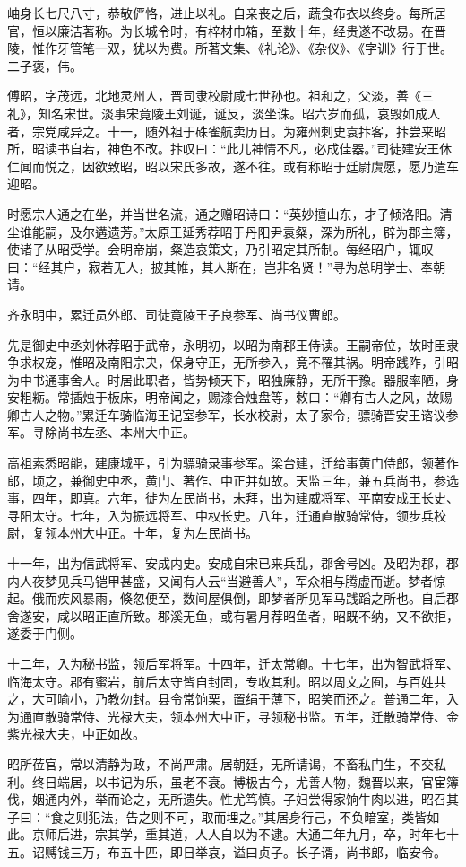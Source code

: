 \documentclass[12pt,UTF8]{ctexbook}
\begin{document}
岫身长七尺八寸，恭敬俨恪，进止以礼。自亲丧之后，蔬食布衣以终身。每所居官，恒以廉洁著称。为长城令时，有梓材巾箱，至数十年，经贵遂不改易。在晋陵，惟作牙管笔一双，犹以为费。所著文集、《礼论》、《杂仪》、《字训》行于世。二子褒，伟。

傅昭，字茂远，北地灵州人，晋司隶校尉咸七世孙也。祖和之，父淡，善《三礼》，知名宋世。淡事宋竟陵王刘诞，诞反，淡坐诛。昭六岁而孤，哀毁如成人者，宗党咸异之。十一，随外祖于硃雀航卖历日。为雍州刺史袁抃客，抃尝来昭所，昭读书自若，神色不改。抃叹曰：“此儿神情不凡，必成佳器。”司徒建安王休仁闻而悦之，因欲致昭，昭以宋氏多故，遂不往。或有称昭于廷尉虞愿，愿乃遣车迎昭。

时愿宗人通之在坐，并当世名流，通之赠昭诗曰：“英妙擅山东，才子倾洛阳。清尘谁能嗣，及尔遘遗芳。”太原王延秀荐昭于丹阳尹袁粲，深为所礼，辟为郡主簿，使诸子从昭受学。会明帝崩，粲造哀策文，乃引昭定其所制。每经昭户，辄叹曰：“经其户，寂若无人，披其帷，其人斯在，岂非名贤！”寻为总明学士、奉朝请。

齐永明中，累迁员外郎、司徒竟陵王子良参军、尚书仪曹郎。

先是御史中丞刘休荐昭于武帝，永明初，以昭为南郡王侍读。王嗣帝位，故时臣隶争求权宠，惟昭及南阳宗夬，保身守正，无所参入，竟不罹其祸。明帝践阼，引昭为中书通事舍人。时居此职者，皆势倾天下，昭独廉静，无所干豫。器服率陋，身安粗粝。常插烛于板床，明帝闻之，赐漆合烛盘等，敕曰：“卿有古人之风，故赐卿古人之物。”累迁车骑临海王记室参军，长水校尉，太子家令，骠骑晋安王谘议参军。寻除尚书左丞、本州大中正。

高祖素悉昭能，建康城平，引为骠骑录事参军。梁台建，迁给事黄门侍郎，领著作郎，顷之，兼御史中丞，黄门、著作、中正并如故。天监三年，兼五兵尚书，参选事，四年，即真。六年，徙为左民尚书，未拜，出为建威将军、平南安成王长史、寻阳太守。七年，入为振远将军、中权长史。八年，迁通直散骑常侍，领步兵校尉，复领本州大中正。十年，复为左民尚书。

十一年，出为信武将军、安成内史。安成自宋已来兵乱，郡舍号凶。及昭为郡，郡内人夜梦见兵马铠甲甚盛，又闻有人云“当避善人”，军众相与腾虚而逝。梦者惊起。俄而疾风暴雨，倏忽便至，数间屋俱倒，即梦者所见军马践蹈之所也。自后郡舍遂安，咸以昭正直所致。郡溪无鱼，或有暑月荐昭鱼者，昭既不纳，又不欲拒，遂委于门侧。

十二年，入为秘书监，领后军将军。十四年，迁太常卿。十七年，出为智武将军、临海太守。郡有蜜岩，前后太守皆自封固，专收其利。昭以周文之囿，与百姓共之，大可喻小，乃教勿封。县令常饷栗，置绢于薄下，昭笑而还之。普通二年，入为通直散骑常侍、光禄大夫，领本州大中正，寻领秘书监。五年，迁散骑常侍、金紫光禄大夫，中正如故。

昭所莅官，常以清静为政，不尚严肃。居朝廷，无所请谒，不畜私门生，不交私利。终日端居，以书记为乐，虽老不衰。博极古今，尤善人物，魏晋以来，官宦簿伐，姻通内外，举而论之，无所遗失。性尤笃慎。子妇尝得家饷牛肉以进，昭召其子曰：“食之则犯法，告之则不可，取而埋之。”其居身行己，不负暗室，类皆如此。京师后进，宗其学，重其道，人人自以为不逮。大通二年九月，卒，时年七十五。诏赙钱三万，布五十匹，即日举哀，谥曰贞子。长子谞，尚书郎，临安令。
\end{document}
